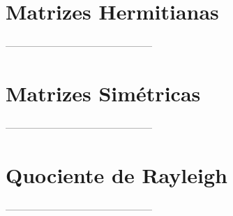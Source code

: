 \section{Matrizes Hermitianas}

	---------------------------------------------
	
\section{Matrizes Simétricas}
	
	---------------------------------------------
	
\section{Quociente de Rayleigh}\label{sec:quocienteRayleigh}
	
	---------------------------------------------